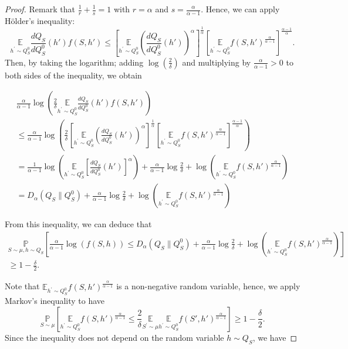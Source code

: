 \begin{noaddcontents}
\begin{proof}[Proof]
Remark that $\frac{1}{r}+\frac{1}{s}=1$ with $r=\alpha$ and $s=\frac{\alpha}{\alpha-1}$. Hence, we can apply Hölder's inequality:
$$
\underset{h^{\prime} \sim Q_S^0}{\mathbb{E}} \frac{dQ_S}{dQ_S^0}(h') f(S,h') \leq\left[\underset{h^{\prime} \sim Q_S^0}{\mathbb{E}}\left(\frac{dQ_S}{dQ_S^0}(h')\right)^{\alpha}\right]^{\frac{1}{\alpha}}\left[\underset{h^{\prime} \sim Q_S^0}{\mathbb{E}} f(S,h')^{\frac{\alpha}{\alpha-1}}\right]^{\frac{\alpha-1}{\alpha}} .
$$
Then, by taking the logarithm; adding $\log \left(\frac{2}{\delta}\right)$ and multiplying by $\frac{\alpha}{\alpha-1}>0$ to both sides of the inequality, we obtain

\begin{multline*}
\frac{\alpha}{\alpha-1} \log \left(\frac{2}{\delta} \underset{h^{\prime} \sim Q_S^0}{\mathbb{E}} \frac{dQ_S}{dQ_S^0}(h') f(S,h')\right) \\
\leq \frac{\alpha}{\alpha-1} \log \left(\frac{2}{\delta}\left[\underset{h^{\prime} \sim Q_S^0}{\mathbb{E}}\left(\frac{dQ_S}{dQ_S^0}(h')\right)^{\alpha}\right]^{\frac{1}{\alpha}}\left[\underset{h^{\prime} \sim Q_S^0}{\mathbb{E}} f(S,h')^{\frac{\alpha}{\alpha-1}}\right]^{\frac{\alpha-1}{\alpha}}\right) \\
 =\frac{1}{\alpha-1} \log \left(\underset{h^{\prime} \sim Q_S^0}{\mathbb{E}}\left[\frac{dQ_S}{dQ_S^0}(h')\right]^{\alpha}\right)+\frac{\alpha}{\alpha-1} \log \frac{2}{\delta}+\log \left(\underset{h^{\prime} \sim Q_S^0}{\mathbb{E}} f(S,h')^{\frac{\alpha}{\alpha-1}}\right) \\
=D_{\alpha}\left(Q_{S} \| Q_S^0\right)+\frac{\alpha}{\alpha-1} \log \frac{2}{\delta}+\log \left(\underset{h^{\prime} \sim Q_S^0}{\mathbb{E}} f(S,h')^{\frac{\alpha}{\alpha-1}}\right)
\end{multline*}

From this inequality, we can deduce that
\begin{multline}
  \label{eq: viallard_dis_eq11}
  \underset{S \sim \mu, h \sim Q_{S}}{\mathbb{P}}\left[\frac{\alpha}{\alpha-1} \log (f(S,h)) \leq D_{\alpha}\left(Q_{S} \| Q_S^0\right)+\frac{\alpha}{\alpha-1} \log \frac{2}{\delta}+\log \left(\underset{h^{\prime} \sim Q_S^0}{\mathbb{E}} f(S,h')^{\frac{\alpha}{\alpha-1}}\right)\right] \\
  \geq 1-\frac{\delta}{2} .
\end{multline}


Note that $\mathbb{E}_{h^{\prime} \sim Q_S^0} f(S,h')^{\frac{\alpha}{\alpha-1}}$ is a non-negative random variable, hence, we apply Markov's inequality to have
$$
\underset{S \sim \mu}{\mathbb{P}}\left[\underset{h^{\prime} \sim Q_S^0}{\mathbb{E}} f(S,h')^{\frac{\alpha}{\alpha-1}} \leq \frac{2}{\delta} \underset{S^{\prime} \sim \mu}{\mathbb{E}} \underset{h^{\prime} \sim Q_S^0}{\mathbb{E}} f(S',h')^{\frac{\alpha}{\alpha-1}}\right] \geq 1-\frac{\delta}{2} .
$$
Since the inequality does not depend on the random variable $h \sim Q_{S}$, we have


\end{proof}
\end{noaddcontents}
